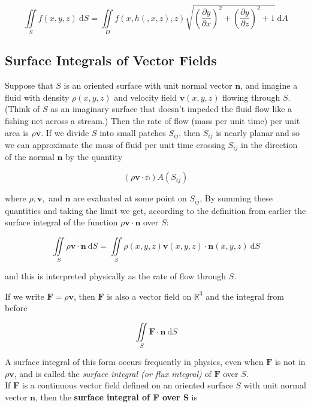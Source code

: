 \documentclass{article}
\begin{document}
\begin{equation*}
    \iint\limits_{S} f(x,y,z) \ \mathrm{d}S = \iint\limits_{D} f(x,h(,x,z),z) \sqrt{(\frac{\partial y}{\partial x})^2 + (\frac{\partial y}{\partial z})^2 + 1} \ \mathrm{d}A
\end{equation*}

\subsection{Surface Integrals of Vector Fields}

Suppose that $S$ is an oriented surface with unit normal vector $\mathbf{n}$, and imagine a fluid with density $\rho(x,y,z)$ and velocity field $\mathbf{v}(x,y,z)$ flowing through $S$. (Think of $S$ as an imaginary surface that doesn't impeded the fluid flow like a fishing net across a stream.) Then the rate of flow (mass per unit time) per unit area is $\rho \mathbf{v}$. If we divide $S$ into small patches $S_{ij}$, then $S_{ij}$ is nearly planar and so we can approximate the mass of fluid per unit time crossing $S_{ij}$ in the direction of the normal $\mathbf{n}$ by the quantity

\begin{equation*}
    (\rho \mathbf{v} \cdot \mathbb{n})A(S_{ij})
\end{equation*}

where $\rho, \mathbf{v}, $ and $\mathbf{n}$ are evaluated at some point on $S_{ij}$, By summing these quantities and taking the limit we get, according to the definition from earlier the surface integral of the function $\rho \mathbf{v} \cdot \mathbf{n}$ over $S$:

\begin{equation*}
    \iint\limits_{S} \rho \mathbf{v} \cdot \mathbf{n} \ \mathrm{d}S = \iint\limits_{S} \rho(x,y,z) \mathbf{v}(x,y,z) \cdot \mathbf{n}(x,y,z) \ \mathrm{d}S
\end{equation*}

and this is interpreted physically as the rate of flow through $S$. 

If we write $\mathbf{F} = \rho \mathbf{v}$, then $\mathbf{F}$ is also a vector field on $\mathbb{R}^3$ and the integral from before 

\begin{equation*}
    \iint\limits_{S} \mathbf{F} \cdot \mathbf{n} \ \mathrm{d}S
\end{equation*}

A surface integral of this form occurs frequently in physics, even when $\mathbf{F}$ is not in $\rho \mathbf{v}$, and is called the \textit{surface integral (or flux integral)} of $\mathbf{F}$ over $S$.
\\
If $\mathbf{F}$ is a continuous vector field defined on an oriented surface $S$ with unit normal vector $\mathbf{n}$, then the \textbf{surface integral of F over S} is 
\end{document}

